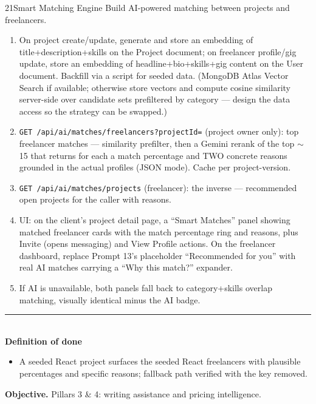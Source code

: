\documentclass[11pt,a4paper]{article}
\newcommand{\dod}{\medskip\noindent\textcolor{donegreen}{\rule{\linewidth}{0.5pt}}\\[1mm]\textbf{\textcolor{donegreen}{Definition of done}}\\[-2mm]}
\newcommand{\objective}[1]{\noindent\textbf{Objective.} #1\medskip}
\begin{document}
\begin{promptbox}{21}{Smart Matching Engine}
Build AI-powered matching between projects and freelancers.

\begin{enumerate}[leftmargin=1.6em]
  \item On project create/update, generate and store an embedding of
        title+description+skills on the Project document; on freelancer profile/gig
        update, store an embedding of headline+bio+skills+gig content on the User
        document. Backfill via a script for seeded data. (MongoDB Atlas Vector Search
        if available; otherwise store vectors and compute cosine similarity
        server-side over candidate sets prefiltered by category --- design the data
        access so the strategy can be swapped.)
  \item \texttt{GET /api/ai/matches/freelancers?projectId=} (project owner only):
        top freelancer matches --- similarity prefilter, then a Gemini rerank of the
        top $\sim$15 that returns for each a match percentage and TWO concrete
        reasons grounded in the actual profiles (JSON mode). Cache per
        project-version.
  \item \texttt{GET /api/ai/matches/projects} (freelancer): the inverse ---
        recommended open projects for the caller with reasons.
  \item UI: on the client's project detail page, a ``Smart Matches'' panel showing
        matched freelancer cards with the match percentage ring and reasons, plus
        Invite (opens messaging) and View Profile actions. On the freelancer
        dashboard, replace Prompt 13's placeholder ``Recommended for you'' with real
        AI matches carrying a ``Why this match?'' expander.
  \item If AI is unavailable, both panels fall back to category+skills overlap
        matching, visually identical minus the AI badge.
\end{enumerate}

\dod
\begin{itemize}[leftmargin=1.6em]
  \item A seeded React project surfaces the seeded React freelancers with plausible
        percentages and specific reasons; fallback path verified with the key
        removed.
\end{itemize}
\end{promptbox}

\objective{Pillars 3 \& 4: writing assistance and pricing intelligence.}
\end{document}
